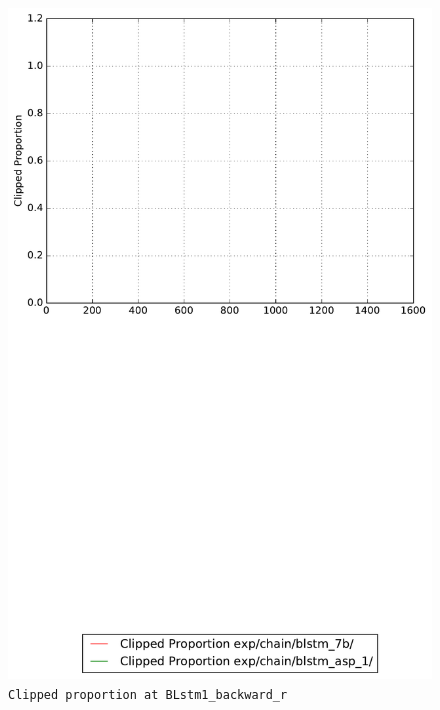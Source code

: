 \documentclass[prl,10pt,twocolumn]{revtex4}
\begin{document}
\newpage
\begin{figure}[h]
  \begin{center}
    \caption{\texttt{Clipped proportion at BLstm1\_backward\_r}}
    \includegraphics[width=\textwidth]{exp/chain/blstm_7b/report/clipped_proportion_BLstm1_backward_r.pdf}
  \end{center}
\end{figure}
\clearpage
\end{document}
